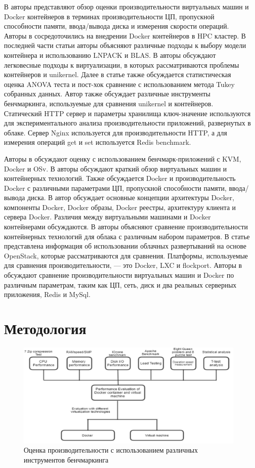 \documentclass{mirea}
\begin{document}
	В \cite{cit3} авторы представляют обзор оценки производительности виртуальных машин и Docker контейнеров в терминах производительности ЦП, пропускной способности памяти, ввода/вывода диска и измерения скорости операций. Авторы в \cite{cit4} сосредоточились на внедрении Docker контейнеров в HPC кластер. В последней части статьи авторы объясняют различные подходы к выбору модели контейнера и использованию LNPACK и BLAS. В \cite{cit5} авторы обсуждают легковесные подходы к виртуализации, в которых рассматриваются проблемы контейнеров и unikernel. Далее в статье также обсуждается статистическая оценка ANOVA теста и пост-хок сравнение с использованием метода Tukey собранных данных. Автор также обсуждает различные инструменты бенчмаркинга, используемые для сравнения unikernel и контейнеров. Статический HTTP сервер и параметры хранилища ключ-значение используются для экспериментального анализа производительности приложений, развернутых в облаке. Сервер Nginx используется для производительности HTTP, а для измерения операций get и set используется Redis benchmark.
	
	Авторы в \cite{cit6} обсуждают оценку с использованием бенчмарк-приложений с KVM, Docker и OSv. В \cite{cit7} авторы обсуждают краткий обзор виртуальных машин и контейнерных технологий. Также обсуждается Docker и производительность Docker с различными параметрами ЦП, пропускной способности памяти, ввода/вывода диска. В \cite{cit8} автор обсуждает основные концепции архитектуры Docker, компоненты Docker, Docker образы, Docker реестры, архитектуру клиента и сервера Docker. Различия между виртуальными машинами и Docker контейнерами обсуждаются. В \cite{cit9} авторы объясняют сравнение производительности контейнерных технологий для облака с различным набором параметров. В статье представлена информация об использовании облачных развертываний на основе OpenStack, которые рассматриваются для сравнения. Платформы, используемые для сравнения производительности, — это Docker, LXC и flockport. Авторы в \cite{cit10} обсуждают сравнение производительности виртуальных машин и Docker по различным параметрам, таким как ЦП, сеть, диск и два реальных серверных приложения, Redis и MySql.
	
	\section{Методология}
	
	\begin{figure}[H]
		\centering
		\includegraphics[width=.7\textwidth]{img3}
		\parskip=6pt
		\caption{Оценка производительности с использованием различных инструментов бенчмаркинга}
		\label{fig:pic3}
	\end{figure}
	
\end{document}

